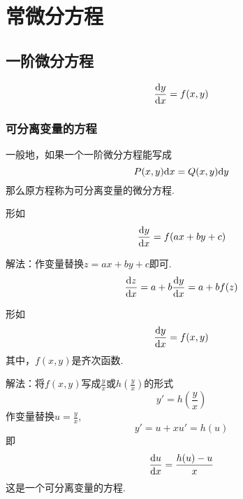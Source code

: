 \chapter{常微分方程}
\section{一阶微分方程}
\sj
\begin{equation}
\frac{{\rm{d}} y}{{\rm{d}} x}=f(x,y)
\end{equation} 
\subsection{可分离变量的方程}
\sj
一般地，如果一个一阶微分方程能写成
\begin{equation}
P(x,y){\rm{d}} x=Q(x,y) {\rm{d}} y
\end{equation}
那么原方程称为可分离变量的微分方程.

\example[可分离变量的方程1]
形如
\begin{equation}
\frac{{\rm{d}} y}{{\rm{d}} x}=f(ax+by+c)
\end{equation}
\par 解法：作变量替换$z=ax+by+c$即可.
\begin{equation}
\frac{{\rm{d}} z}{{\rm{d}} x}=a+b\frac{{\rm{d}} y}{{\rm{d}} x}=a+bf(z)
\end{equation}

\example[可分离变量的方程2]
形如
\begin{equation}
\frac{{\rm{d}} y}{{\rm{d}} x}=f(x,y)
\end{equation}
其中，$f(x,y)$是齐次函数.
\par 解法：将$f(x,y)$写成$\displaystyle \frac{y}{x}$或$\displaystyle h\left( \frac{y}{x}\right) $的形式
\begin{equation}
y'=h(\frac{y}{x})
\end{equation}
作变量替换$\displaystyle u=\frac{y}{x}$,
\begin{equation}
y'=u+xu'=h(u)
\end{equation}
即
\begin{equation}
\frac{{\rm{d}} u}{{\rm{d}} x}=\frac{h(u)-u}{x}
\end{equation}
这是一个可分离变量的方程.
\newpage 

